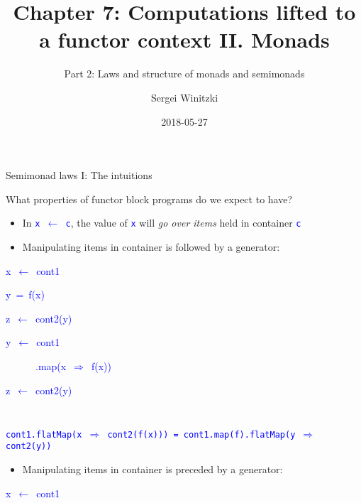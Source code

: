 \documentclass[english]{beamer}
\title[Chapter 7: Functor-lifted computations II]{Chapter 7: Computations lifted to a functor context II. Monads}
\subtitle{Part 2: Laws and structure of monads and semimonads}
\author{Sergei Winitzki}
\date{2018-05-27}
\institute[ABTB]{Academy by the Bay}
\newenvironment{lyxcode}
  {\par\begin{list}{}{
    \setlength{\rightmargin}{\leftmargin}
    \setlength{\listparindent}{0pt}%
    \raggedright
    \setlength{\itemsep}{0pt}
    \setlength{\parsep}{0pt}
    \normalfont\ttfamily}%
   \def\{{\char`\{}
   \def\}{\char`\}}
   \def\textasciitilde{\char`\~}
   \item[]}
  {\end{list}}
\begin{document}
\frame{\titlepage}
\begin{frame}{Semimonad laws I: The intuitions}

What properties of functor block programs do we expect to have?
\begin{itemize}
\item In \texttt{\textcolor{blue}{\footnotesize{}x $\leftarrow$ c}}, the
value of \texttt{\textcolor{blue}{\footnotesize{}x}} will \emph{go
over items} held in container \texttt{\textcolor{blue}{\footnotesize{}c}} 
\item Manipulating items in container is followed by a generator:
\end{itemize}
\texttt{\textcolor{blue}{\footnotesize{}}}%
\begin{minipage}[c][1\totalheight][t]{0.49\columnwidth}%
\begin{lyxcode}
\textcolor{blue}{\footnotesize{}x~$\leftarrow$~cont1}{\footnotesize\par}

\textcolor{blue}{\footnotesize{}y~=~f(x)}{\footnotesize\par}

\textcolor{blue}{\footnotesize{}z~$\leftarrow$~cont2(y)}{\footnotesize\par}
\end{lyxcode}
%
\end{minipage}\texttt{\textcolor{blue}{\footnotesize{}\hfill{}}}%
\begin{minipage}[c][1\totalheight][t]{0.4\columnwidth}%
\begin{lyxcode}
\textcolor{blue}{\footnotesize{}y~$\leftarrow$~cont1}{\footnotesize\par}

\textcolor{blue}{\footnotesize{}~~~~~~.map(x~$\Rightarrow$~f(x))}{\footnotesize\par}

\textcolor{blue}{\footnotesize{}z~$\leftarrow$~cont2(y)}{\footnotesize\par}
\end{lyxcode}
%
\end{minipage}\texttt{\textcolor{blue}{\footnotesize{}\hfill{}\medskip{}
}}{\footnotesize\par}

\texttt{\textcolor{blue}{\footnotesize{}cont1.flatMap(x $\Rightarrow$
cont2(f(x))) = cont1.map(f).flatMap(y $\Rightarrow$ cont2(y))}} 
\begin{itemize}
\item Manipulating items in container is preceded by a generator:
\end{itemize}
\texttt{\textcolor{blue}{\footnotesize{}}}%
\begin{minipage}[c][1\totalheight][t]{0.49\columnwidth}%
\begin{lyxcode}
\textcolor{blue}{\footnotesize{}x~$\leftarrow$~cont1}{\footnotesize\par}


\end{lyxcode}
\end{minipage}
\end{frame}
\end{document}
